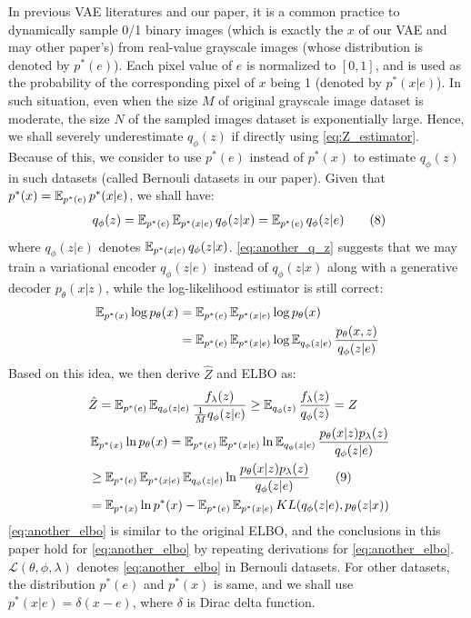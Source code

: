 In previous VAE literatures and our paper, it is a common practice to dynamically sample 0/1 binary images (which is exactly the $x$ of our VAE and may other paper's) from real-value grayscale images (whose distribution is denoted by $p^*(e)$). Each pixel value of $e$ is normalized to $[0, 1]$, and is used as the probability of the corresponding pixel of $x$ being 1 (denoted by $p^*(x|e)$). In such situation, even when the size $M$ of original grayscale image dataset is moderate, the size $N$ of the sampled images dataset is exponentially large. Hence, we shall severely underestimate $q_\phi(z)$ if directly using \cref{eq:Z_estimator}. Because of this, we consider to use $p^*(e)$ instead of $p^*(x)$ to estimate $q_\phi(z)$ in such datasets (called Bernouli datasets in our paper). Given that $p^*(x) = \operatorname{\mathbb{E}}_{p^*(e)} p^*(x|e)$, we shall have:
\begin{align*}~\label{eq:another_q_z}
	q_\phi(z) = \operatorname{\mathbb{E}}_{p^*(e)} \operatorname{\mathbb{E}}_{p^*(x|e)} q_\phi(z|x) = \operatorname{\mathbb{E}}_{p^*(e)}q_\phi(z|e) \tag{8}
\end{align*}
where $q_\phi(z|e)$ denotes $\operatorname{\mathbb{E}}_{p^*(x|e)} q_\phi(z|x)$. \cref{eq:another_q_z} suggests that we may train a variational encoder $q_\phi(z|e)$ instead of $q_\phi(z|x)$ along with a generative decoder $p_\theta(x|z)$, while the log-likelihood estimator is still correct:
\begin{align*}
	\operatorname{\mathbb{E}}_{p^*(x)} \log p_\theta(x) &= \operatorname{\mathbb{E}}_{p^*(e)} \operatorname{\mathbb{E}}_{p^*(x|e)} \log p_\theta(x) \\
	&= \operatorname{\mathbb{E}}_{p^*(e)} \operatorname{\mathbb{E}}_{p^*(x|e)} \log \operatorname{\mathbb{E}}_{q_\phi(z|e)} \frac{p_\theta(x, z)}{q_\phi(z|e)}
\end{align*}
Based on this idea, we then derive $\hat{Z}$ and ELBO as:
\begin{align*}~\label{eq:another_elbo}
    &\hat{Z} = \operatorname{\mathbb{E}}_{p^*(e)}\operatorname{\mathbb{E}}_{q_\phi(z|e)} \frac{f_\lambda(z)}{\frac{1}{M}q_\phi(z|e)} \geq
	\operatorname{\mathbb{E}}_{q_\phi(z)}\frac{f_\lambda(z)}{q_\phi(z)} = Z \\
	&\operatorname{\mathbb{E}}_{p^*(x)} \ln p_\theta(x) = \operatorname{\mathbb{E}}_{p^*(e)} \operatorname{\mathbb{E}}_{p^*(x|e)} \ln \operatorname{\mathbb{E}}_{q_\phi(z|e)} \frac{p_\theta(x|z)p_\lambda(z)}{q_\phi(z|e)} \\
    &\geq \operatorname{\mathbb{E}}_{p^*(e)} \operatorname{\mathbb{E}}_{p^*(x|e)} \operatorname{\mathbb{E}}_{q_\phi(z|e)} \ln \frac{p_\theta(x|z)p_\lambda(z)}{q_\phi(z|e)} \tag{9} \\
    &= \operatorname{\mathbb{E}}_{p^*(x)} \ln p^*(x) - \operatorname{\mathbb{E}}_{p^*(e)} \operatorname{\mathbb{E}}_{p^*(x|e)} KL(q_\phi(z|e), p_\theta(z|x)) 
\end{align*}
\cref{eq:another_elbo} is similar to the original ELBO, and the conclusions in this paper hold for \cref{eq:another_elbo} by repeating derivations for \cref{eq:another_elbo}. $\mathcal{L}(\theta, \phi, \lambda)$ denotes \cref{eq:another_elbo} in Bernouli datasets. 
For other datasets, the distribution $p^*(e)$ and $p^*(x)$ is same, and we shall use $p^*(x|e) = \delta(x - e)$, where $\delta$ is Dirac delta function.%

